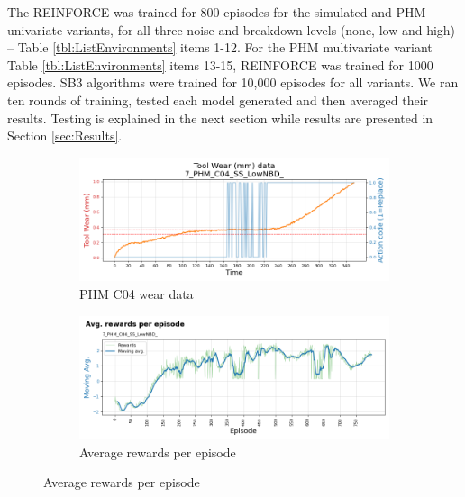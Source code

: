 \documentclass[a4paper, 12pt]{article}
\begin{document}
The REINFORCE was trained for 800 episodes for the simulated and PHM univariate variants, for all three noise and breakdown levels (none, low and high) -- Table \ref{tbl:ListEnvironments} items 1-12. For the PHM multivariate variant Table \ref{tbl:ListEnvironments} items 13-15, REINFORCE was trained for 1000 episodes. SB3 algorithms were trained for 10,000 episodes for all variants. We ran ten rounds of training, tested each model generated and then averaged their results. Testing is explained in the next section while results are presented in Section \ref{sec:Results}.

\begin{figure}[ht]
	\begin{subfigure}[b]{0.5\textwidth}
		\centering
		\includegraphics[width=\textwidth]{images/TrainingPlots/7_PHM_C04_SS_LowNBD__wear_plot.png}  
		\caption{PHM C04 wear data}
		\label{fig:C04wear}
	\end{subfigure}
	\hfill
	\begin{subfigure}[b]{0.5\textwidth}
		\centering
		\includegraphics[width=\textwidth]{images/TrainingPlots/7_PHM_C04_SS_LowNBD__Avg_episode_rewards.png}  
		\caption{Average rewards per episode}
		\label{fig:C04rewards}
	\end{subfigure} \par\bigskip
	

\end{figure}
\end{document}
